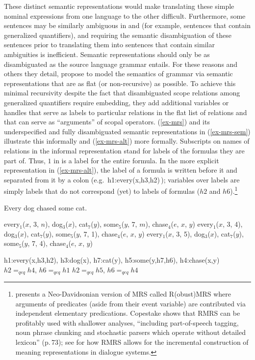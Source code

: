 \documentclass[output=paper,biblatex,babelshorthands,newtxmath,draftmode,colorlinks,citecolor=brown]{langscibook}
\begin{document}
These distinct semantic representations would make translating these simple nominal expressions from one language to the other difficult. Furthermore, some sentences may be similarly ambiguous in  and  (for example, sentences that contain generalized quantifiers), and requiring the semantic disambiguation of these sentences prior to translating them into sentences that contain similar ambiguities is inefficient. Semantic representations should only be as disambiguated as the source language grammar entails. For these reasons and others they detail, \citet{Copestakeetal1995} propose to model the semantics of grammar via semantic representations that are as flat (or non-recursive) as possible. To achieve this minimal recursivity despite the fact that disambiguated scope relations among generalized quantifiers require embedding, they add additional variables or handles that serve as labels to particular relations in the flat list of relations and that can serve as ``arguments'' of scopal operators. (\ref{ex-mrs}) and its underspecified and fully disambiguated semantic representations in (\ref{ex-mrs-sem}) illustrate this informally and (\ref{ex-mrs-alt}) more formally. Subscripts on names of relations in the informal representation stand for labels of the formulas they are part of. Thus, $1$ in  is a label for the entire formula. In the more explicit representation in (\ref{ex-mrs-alt}), the label of a formula is written before it and separated from it by a colon (e.g.\ h1:every(x,h3,h2)\,); 
variables over labels are simply labels that do not correspond (yet) to labels of formulas ($h2$ and $h6$).\footnote{\citet{Copestake2007} presents a Neo-Davidsonian version of MRS called R(obust)MRS where arguments of predicates (aside from their event variable) are contributed via independent elementary predications. Copestake shows that RMRS can be profitably used with shallower analyses, ``including part-of-speech tagging, noun phrase chunking and stochastic parsers which operate without detailed lexicon'' (p.\,73); see \citet{PeldzusandSchlangen2012} for how RMRS allows for the incremental construction of meaning representations in dialogue systems.}

\begin{exe}
\ex\label{ex-mrs}
Every dog chased some cat.
\ex\label{ex-mrs-sem}
\begin{xlist}
\ex\label{ex-mrs-sem-a}
every$_{1}$($x$, 3, $n$), dog$_{3}$($x$), cat$_{7}$($y$), some$_{5}$($y$, 7, $m$), chase$_{4}$($e$, $x$, $y$)
\ex\label{ex-mrs-sem-b}
every$_{1}$($x$, 3, 4), dog$_{3}$($x$), cat$_{7}$($y$), some$_{5}$($y$, 7, 1), chase$_{4}$($e$, $x$, $y$)
\ex\label{ex-mrs-sem-c}
every$_{1}$($x$, 3, 5), dog$_{3}$($x$), cat$_{7}$($y$), some$_{5}$($y$, 7, 4), chase$_{4}$($e$, $x$, $y$)
\end{xlist}
\ex\label{ex-mrs-alt}
\begin{xlist}
\ex\label{ex-mrs-alt-a}
h1:every(x,h3,h2), h3:dog(x), h7:cat(y), h5:some(y,h7,h6), h4:chase(x,y)
\ex\label{ex-mrs-alt-b}
$h2=_{qeq}h4$, $h6=_{qeq}h1$
\ex\label{ex-mrs-alt-c}
$h2=_{qeq}h5$, $h6=_{qeq}h4$
\end{xlist}
\end{exe} 
\end{document}
